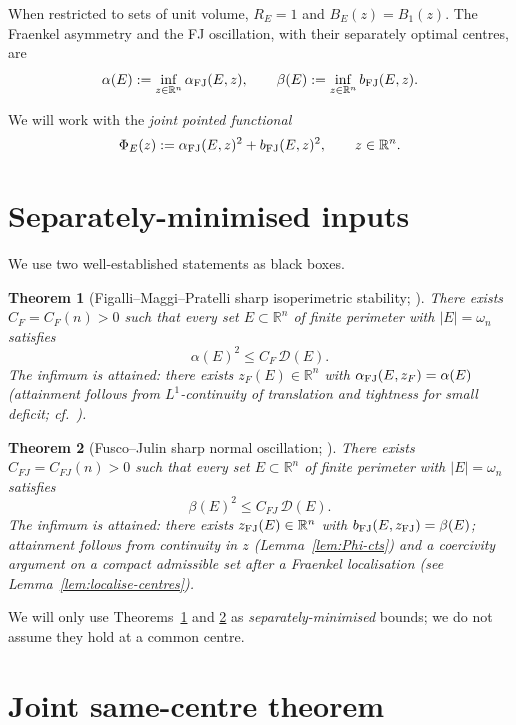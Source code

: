\documentclass[11pt]{article}
\newtheorem{theorem}{Theorem}[section]
\theoremstyle{definition}
\newcommand{\R}{\mathbb{R}}
\newcommand{\dD}{\mathcal D}
\newcommand{\alphaFJ}{\alpha_{\rm FJ}}
\newcommand{\bFJ}{b_{\rm FJ}}
\begin{document}
When restricted to sets of unit volume, \(R_E=1\) and
\(B_E(z)=B_1(z)\).  The Fraenkel asymmetry and the FJ
oscillation, with their separately optimal centres, are
\[
   \alpha(E):=\inf_{z\in\R^{n}}\alphaFJ(E,z),
   \qquad
   \beta(E):=\inf_{z\in\R^{n}}\bFJ(E,z).
\]

We will work with the \emph{joint pointed functional}
\[
   \Phi_E(z):=\alphaFJ(E,z)^{2}+\bFJ(E,z)^{2},\qquad z\in\R^{n}.
\]

\section{Separately-minimised inputs}\label{sec:inputs}

We use two well-established statements as black boxes.

\begin{theorem}[Figalli--Maggi--Pratelli sharp isoperimetric stability;
\cite{FigalliMaggiPratelli2010,FuscoMaggiPratelli2008}]
\label{thm:FMP}
There exists \(C_F=C_F(n)>0\) such that every set \(E\subset\R^{n}\) of
finite perimeter with \(|E|=\omega_n\) satisfies
\[
   \alpha(E)^{2}\le C_F\,\dD(E).
\]
The infimum is attained: there exists \(z_F(E)\in\R^{n}\) with
\(\alphaFJ(E,z_F)=\alpha(E)\) (attainment follows from
\(L^{1}\)-continuity of translation and tightness for small
deficit; cf.\ \cite[Ch.~12--13]{Maggi2012}).
\end{theorem}

\begin{theorem}[Fusco--Julin sharp normal oscillation;
\cite{FuscoJulin2014}]
\label{thm:FJ}
There exists \(C_{FJ}=C_{FJ}(n)>0\) such that every set
\(E\subset\R^{n}\) of finite perimeter with \(|E|=\omega_n\)
satisfies
\[
   \beta(E)^{2}\le C_{FJ}\,\dD(E).
\]
The infimum is attained: there exists \(z_{\rm FJ}(E)\in\R^{n}\) with
\(\bFJ(E,z_{\rm FJ})=\beta(E)\); attainment follows from continuity in
\(z\) (Lemma~\ref{lem:Phi-cts}) and a coercivity argument on a
compact admissible set after a Fraenkel localisation (see
Lemma~\ref{lem:localise-centres}).
\end{theorem}

We will only use Theorems~\ref{thm:FMP} and \ref{thm:FJ} as
\emph{separately-minimised} bounds; we do not assume they hold at a
common centre.

\section{Joint same-centre theorem}\label{sec:joint}
\end{document}

